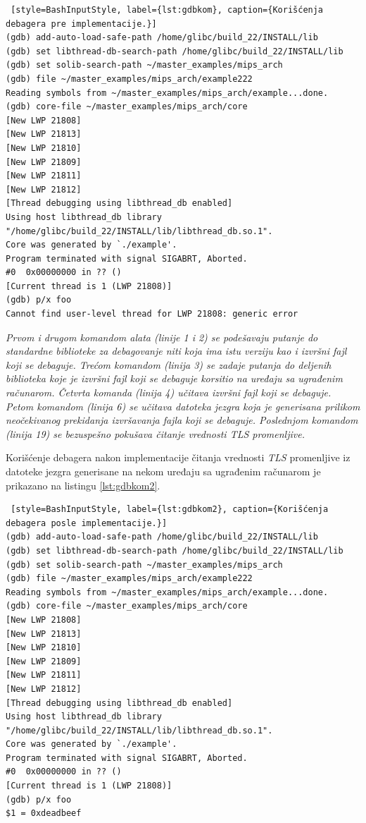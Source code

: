 \documentclass[12pt,oneside]{memoir}
\begin{document}
\begin{lstlisting} [style=BashInputStyle, label={lst:gdbkom}, caption={Korišćenja debagera pre implementacije.}]
(gdb) add-auto-load-safe-path /home/glibc/build_22/INSTALL/lib
(gdb) set libthread-db-search-path /home/glibc/build_22/INSTALL/lib
(gdb) set solib-search-path ~/master_examples/mips_arch
(gdb) file ~/master_examples/mips_arch/example222 
Reading symbols from ~/master_examples/mips_arch/example...done.
(gdb) core-file ~/master_examples/mips_arch/core
[New LWP 21808]
[New LWP 21813]
[New LWP 21810]
[New LWP 21809]
[New LWP 21811]
[New LWP 21812]
[Thread debugging using libthread_db enabled]
Using host libthread_db library "/home/glibc/build_22/INSTALL/lib/libthread_db.so.1".
Core was generated by `./example'.
Program terminated with signal SIGABRT, Aborted.
#0  0x00000000 in ?? ()
[Current thread is 1 (LWP 21808)]
(gdb) p/x foo
Cannot find user-level thread for LWP 21808: generic error
\end{lstlisting}

\emph{Prvom i drugom komandom alata (linije 1 i 2) se podešavaju putanje do standardne biblioteke za debagovanje niti koja ima istu verziju kao i izvršni fajl koji se debaguje. Trećom komandom (linija 3) se zadaje putanja do deljenih biblioteka koje je izvršni fajl koji se debaguje korsitio na uređaju sa ugrađenim računarom. Četvrta komanda (linija 4) učitava izvršni fajl koji se debaguje. Petom komandom (linija 6) se učitava datoteka jezgra koja je generisana prilikom neočekivanog prekidanja izvršavanja fajla koji se debaguje. Poslednjom komandom (linija 19) se bezuspešno pokušava čitanje vrednosti \emph{TLS} promenljive.}

Korišćenje debagera nakon implementacije čitanja vrednosti \emph{TLS} promenljive iz datoteke jezgra generisane na nekom uređaju sa ugrađenim računarom je prikazano na listingu \ref{lst:gdbkom2}.\newpage

\begin{lstlisting} [style=BashInputStyle, label={lst:gdbkom2}, caption={Korišćenja debagera posle implementacije.}]
(gdb) add-auto-load-safe-path /home/glibc/build_22/INSTALL/lib
(gdb) set libthread-db-search-path /home/glibc/build_22/INSTALL/lib
(gdb) set solib-search-path ~/master_examples/mips_arch
(gdb) file ~/master_examples/mips_arch/example222 
Reading symbols from ~/master_examples/mips_arch/example...done.
(gdb) core-file ~/master_examples/mips_arch/core
[New LWP 21808]
[New LWP 21813]
[New LWP 21810]
[New LWP 21809]
[New LWP 21811]
[New LWP 21812]
[Thread debugging using libthread_db enabled]
Using host libthread_db library "/home/glibc/build_22/INSTALL/lib/libthread_db.so.1".
Core was generated by `./example'.
Program terminated with signal SIGABRT, Aborted.
#0  0x00000000 in ?? ()
[Current thread is 1 (LWP 21808)]
(gdb) p/x foo
$1 = 0xdeadbeef
\end{lstlisting}
\end{document}
